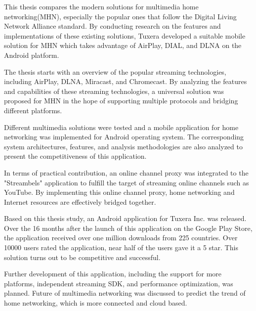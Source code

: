 This thesis compares the modern solutions for multimedia home networking(MHN),
especially the popular ones that follow the Digital Living Network Alliance standard. By conducting research on the features and implementations of these existing solutions, Tuxera developed a suitable mobile solution for MHN
 which takes advantage of AirPlay, DIAL, and DLNA on the Android
 platform.

The thesis starts with an overview of the popular streaming technologies, including AirPlay,
DLNA, Miracast, and Chromecast. By analyzing the features and capabilities of
these streaming technologies, a universal solution was proposed for MHN in the hope of  supporting multiple protocols and bridging
 different platforms.

Different multimedia solutions were tested and a mobile application
for home networking was implemented for Android operating system. The corresponding system architectures, features, and analysis methodologies are also analyzed to present the competitiveness of this application.

In terms of practical contribution, an online channel proxy was integrated to  the "Streambels" application to fulfill the target of streaming online channels such as YouTube. By implementing this online channel proxy, home
 networking and Internet resources are effectively bridged together. 

Based on this thesis study, an Android application for Tuxera Inc. was released. Over the 16 months after the launch of this application on the Google Play Store, the application received over one million downloads from 225 countries. Over 10000 users rated the application, near half of the users gave it a 5 star. This solution turns out to be competitive and successful.

Further development of this application, including the support for more platforms, independent streaming SDK, and performance optimization, was planned. Future of multimedia networking was discussed to predict the trend of home networking, which is more connected and cloud based.